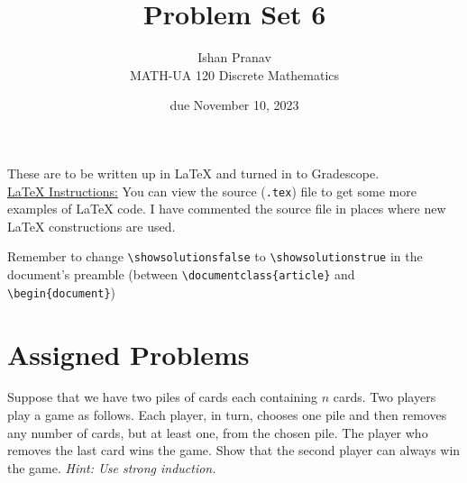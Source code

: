 \documentclass{article}
\title{Problem Set 6}
\author{%
    Ishan Pranav
\\  MATH-UA 120 Discrete Mathematics
}
\date{due November 10, 2023}
\newif\ifshowsolutions
\newcommand{\danger}{\marginpar[\hfill\dbend]{\dbend\hfill}}
\theoremstyle{definition}
\begin{document}
\maketitle
These are to be written up in \LaTeX{} and turned in to Gradescope.\\
\ifshowsolutions
    \SetupExSheets{solution/print=true}
\else
    \danger
 \underline{ \LaTeX{}  Instructions:}  You can view the source (\texttt{.tex}) file to get some more examples of \LaTeX{} code.  I have commented the source file in places where new \LaTeX{} constructions are used.
  
  Remember to change \verb|\showsolutionsfalse| to \verb|\showsolutionstrue|
    in the document's preamble 
    (between \verb|\documentclass{article}| and \verb|\begin{document}|)
\fi
\section*{Assigned Problems}
\begin{question}
    Suppose that we have two piles of cards each containing $n$ cards. Two players play a game as follows. Each player, in turn, chooses one pile and then removes any number of cards, but at least one, from the chosen pile. The player who removes the last card wins the game. Show that the second player can always win the game. 
    \textit{Hint: Use strong induction.}
\end{question}
\end{document}
